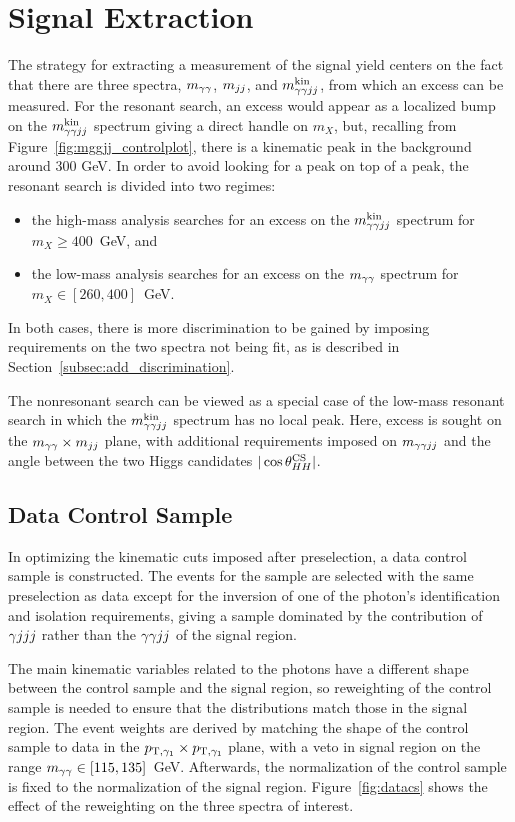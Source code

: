 \section{Signal Extraction\label{sec:extraction}}

The strategy for extracting a measurement of the signal yield centers on the fact that there
are three spectra, $m_{\gamma\gamma}$, $m_{jj}$, and $m_{\gamma\gamma jj}^{\rm kin}$, from which an excess can be measured.
For the resonant search, an excess would appear as a localized bump on the
$m_{\gamma\gamma jj}^{\rm kin}$ spectrum giving a direct handle on $m_X$,
but, recalling from Figure~\ref{fig:mggjj_controlplot}, there is a kinematic peak in the background
around 300 GeV. In order to avoid looking for a peak on top of a peak, the resonant search is
divided into two regimes:
\begin{itemize}
\item the high-mass analysis searches for an excess on the $m_{\gamma\gamma jj}^{\rm kin}$ spectrum for $m_X \ge 400$~GeV, and
\item the low-mass analysis searches for an excess on the $m_{\gamma\gamma}$ spectrum for $m_X \in [260, 400]$~GeV.
\end{itemize}
In both cases, there is more discrimination to be gained by imposing requirements on the two spectra
not being fit, as is described in Section~\ref{subsec:add_discrimination}.

The nonresonant search can be viewed as a special case of the low-mass resonant search in which
the $m_{\gamma\gamma jj}^{\rm kin}$ spectrum has no local peak. Here, excess is sought on the $m_{\gamma\gamma} \times m_{jj}$ plane,
with additional requirements imposed on $m_{\gamma\gamma jj}$ and the angle between the two Higgs candidates
$|\cos {\theta^{\rm CS}_{HH}}|$.

\subsection{Data Control Sample\label{subsec:dataCS}}

In optimizing the kinematic cuts imposed after preselection, a data control sample is constructed.
The events for the sample are selected with the same preselection as data except for
the inversion of one of the photon's identification and isolation requirements, giving a sample
dominated by the contribution of $\gamma jjj$ rather than the $\gamma\gamma jj$ of the signal region.

The main kinematic variables related to the photons have a different shape
between the control sample and the
signal region, so reweighting of the control sample is needed to ensure that the distributions
match those in the signal region. The event weights are derived by matching the shape
of the control sample to data in the $p_{{\rm T},\gamma_1} \times p_{{\rm T},\gamma_1}$ plane,
with a veto in signal region on the range $m_{\gamma\gamma} \in [115, 135]$~GeV. Afterwards,
the normalization of the control sample is fixed to the normalization of the signal
region. Figure~\ref{fig:datacs}
shows the effect of the reweighting on the three spectra of interest.

